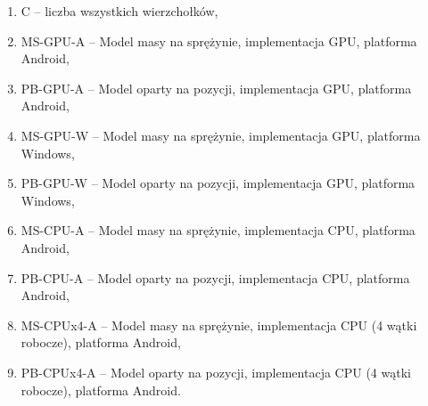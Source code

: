 		\begin{enumerate}
			\item C -- liczba wszystkich wierzchołków,
			\item MS-GPU-A -- Model masy na sprężynie, implementacja GPU, platforma Android,
			\item PB-GPU-A -- Model oparty na pozycji, implementacja GPU, platforma Android,
			\item MS-GPU-W -- Model masy na sprężynie, implementacja GPU, platforma Windows,
			\item PB-GPU-W -- Model oparty na pozycji, implementacja GPU, platforma Windows,
			\item MS-CPU-A -- Model masy na sprężynie, implementacja CPU, platforma Android,
			\item PB-CPU-A -- Model oparty na pozycji, implementacja CPU, platforma Android,
			\item MS-CPUx4-A -- Model masy na sprężynie, implementacja CPU (4 wątki robocze), platforma Android,
			\item PB-CPUx4-A -- Model oparty na pozycji, implementacja CPU (4 wątki robocze), platforma Android.
			\newline
		\end{enumerate}
		
		
		
		
